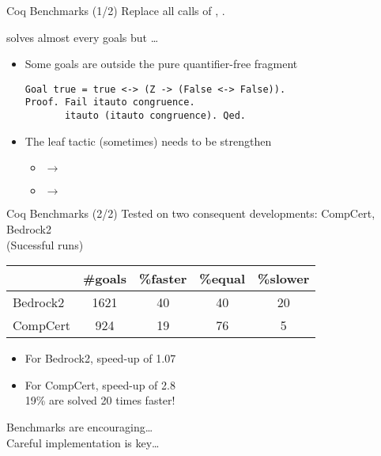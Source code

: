 \documentclass{beamer}
\begin{document}
\begin{frame}[fragile]{Coq Benchmarks (1/2)}
  Replace all calls of , .
  \medskip
  
   solves almost every goals but \dots
  \begin{itemize}
  \item Some goals are outside the pure quantifier-free fragment
\begin{verbatim}
Goal true = true <-> (Z -> (False <-> False)).
Proof. Fail itauto congruence.
       itauto (itauto congruence). Qed.
\end{verbatim}
  \item The leaf tactic (sometimes) needs to be strengthen
    \begin{itemize}
    \item {} $\to$ 
    \item {} $\to$ 
    \end{itemize}
  \end{itemize}

\end{frame}

\begin{frame}[fragile]{Coq Benchmarks (2/2)}
  Tested on two consequent developments: CompCert, Bedrock2\\
  (Sucessful runs)
  \bigskip
  
  \begin{tabular}{|l|c|c|c|c|}
    \hline
    & \#goals & \%faster & \%equal & \%slower \\
    \hline
    Bedrock2  & 1621   &   40   &   40    &   20     \\
    \hline
    CompCert  & 924    &   19   &   76    &   5      \\
    \hline
  \end{tabular}
  \bigskip
  
  \begin{itemize}
  \item  For Bedrock2, speed-up of 1.07
  \item  For CompCert, speed-up of 2.8\\
    19\% are solved 20 times faster!
  \end{itemize}

  Benchmarks are encouraging\dots\\
  Careful implementation is key\dots
  
\end{frame}
\end{document}
